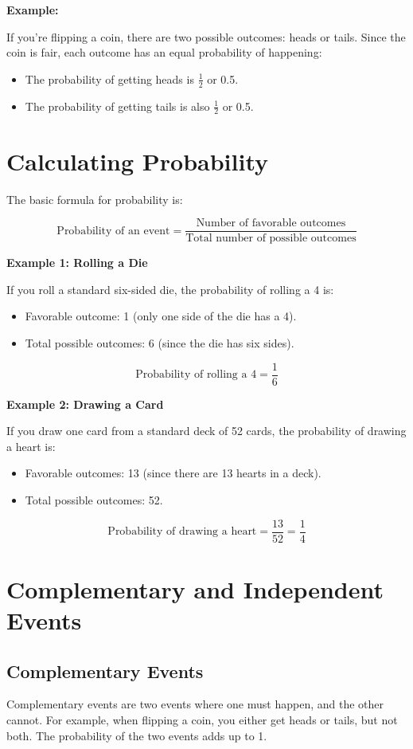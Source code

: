 \textbf{Example:}

If you're flipping a coin, there are two possible outcomes: heads or tails. Since the coin is fair, each outcome has an equal probability of happening:

\begin{itemize}
    \item The probability of getting heads is $\frac{1}{2}$ or 0.5.
    \item The probability of getting tails is also $\frac{1}{2}$ or 0.5.
\end{itemize}

\section{Calculating Probability}
The basic formula for probability is:

\[
\text{Probability of an event} = \frac{\text{Number of favorable outcomes}}{\text{Total number of possible outcomes}}
\]

\textbf{Example 1: Rolling a Die}

If you roll a standard six-sided die, the probability of rolling a 4 is:

\begin{itemize}
    \item Favorable outcome: 1 (only one side of the die has a 4).
    \item Total possible outcomes: 6 (since the die has six sides).
\end{itemize}

\[
\text{Probability of rolling a 4} = \frac{1}{6}
\]

\textbf{Example 2: Drawing a Card}

If you draw one card from a standard deck of 52 cards, the probability of drawing a heart is:

\begin{itemize}
    \item Favorable outcomes: 13 (since there are 13 hearts in a deck).
    \item Total possible outcomes: 52.
\end{itemize}

\[
\text{Probability of drawing a heart} = \frac{13}{52} = \frac{1}{4}
\]

\section{Complementary and Independent Events}
\subsection{Complementary Events}
Complementary events are two events where one must happen, and the other cannot. For example, when flipping a coin, you either get heads or tails, but not both. The probability of the two events adds up to 1.

